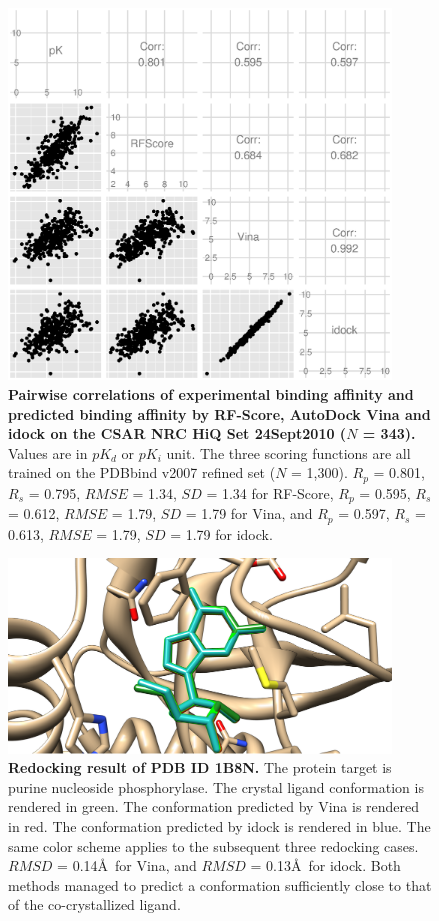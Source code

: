 \documentclass[10pt]{article}
\begin{document}
\begin{figure}[!ht]
\begin{center}
\includegraphics[width=4in]{CSAR2010Correlations.eps}
\end{center}
\caption{
{\bf Pairwise correlations of experimental binding affinity and predicted binding affinity by RF-Score, AutoDock Vina and idock on the CSAR NRC HiQ Set 24Sept2010 ($N$ = 343).} Values are in $pK_d$ or $pK_i$ unit. The three scoring functions are all trained on the PDBbind v2007 refined set ($N$ = 1,300). $R_p$ = 0.801, $R_s$ = 0.795, $RMSE$ = 1.34, $SD$ = 1.34 for RF-Score, $R_p$ = 0.595, $R_s$ = 0.612, $RMSE$ = 1.79, $SD$ = 1.79 for Vina, and $R_p$ = 0.597, $R_s$ = 0.613, $RMSE$ = 1.79, $SD$ = 1.79 for idock.
}
\label{CSAR2010Correlations}
\end{figure}

\begin{figure}[!ht]
\begin{center}
\includegraphics[width=4in]{Redocking1B8N.eps}
\end{center}
\caption{
{\bf Redocking result of PDB ID 1B8N.} The protein target is purine nucleoside phosphorylase. The crystal ligand conformation is rendered in green. The conformation predicted by Vina is rendered in red. The conformation predicted by idock is rendered in blue. The same color scheme applies to the subsequent three redocking cases. $RMSD$ = 0.14\AA\ for Vina, and $RMSD$ = 0.13\AA\ for idock. Both methods managed to predict a conformation sufficiently close to that of the co-crystallized ligand.
}
\label{Redocking1B8N}
\end{figure}
\end{document}
